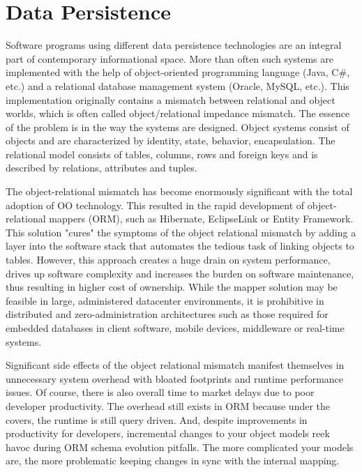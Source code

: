\section{Data Persistence}
\label{ref:product-philosophy-data-persistence}

Software programs using different data persistence technologies are an integral part of contemporary informational space. More than often such systems are implemented with the help of object-oriented programming language (Java, C\#, etc.) and a relational database management system (Oracle, MySQL, etc.). This implementation originally contains a mismatch between relational and object worlds, which is often called object/relational impedance mismatch. The essence of the problem is in the way the systems are designed. Object systems consist of objects and are characterized by identity, state, behavior, encapsulation. The relational model consists of tables, columns, rows and foreign keys and is described by relations, attributes and tuples.

The object-relational mismatch has become enormously significant with the total adoption of OO technology. This resulted in the rapid development of object-relational mappers (ORM), such as Hibernate, EclipseLink or Entity Framework. This solution "cures" the symptoms of the object relational mismatch by adding a layer into the software stack that automates the tedious task of linking objects to tables. However, this approach creates a huge drain on system performance, drives up software complexity and increases the burden on software maintenance, thus resulting in higher cost of ownership. While the mapper solution may be feasible in large, administered datacenter environments, it is prohibitive in distributed and zero-administration architectures such as those required for embedded databases in client software, mobile devices, middleware or real-time systems.

Significant side effects of the object relational mismatch manifest themselves in unnecessary system overhead with bloated footprints and runtime performance issues. Of course, there is also overall time to market delays due to poor developer productivity. The overhead still exists in ORM because under the covers, the runtime is still query driven. And, despite improvements in productivity for developers, incremental changes to your object models reek havoc during ORM schema evolution pitfalls. The more complicated your models are, the more problematic keeping changes in sync with the internal mapping.


